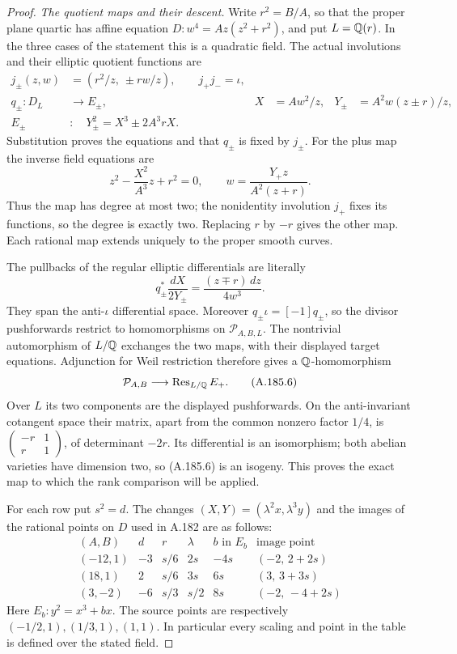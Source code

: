\begin{proof}
\emph{The quotient maps and their descent.}
Write \(r^2=B/A\), so that the proper plane quartic has affine equation
\(D:w^4=Az(z^2+r^2)\), and put \(L=\mathbb Q(r)\).  In the three cases
of the statement this is a quadratic field.  The actual involutions
and their elliptic quotient functions are
\[
\begin{aligned}
 j_\pm(z,w)&=(r^2/z,\ \pm rw/z),\qquad j_+j_-=\iota,\\
 q_\pm:D_L&\longrightarrow E_\pm,
 &X&=Aw^2/z,&Y_\pm&=A^2w(z\pm r)/z,\\
 E_\pm&:\quad Y_\pm^2=X^3\pm2A^3rX.
\end{aligned}
\tag{A.185.3}
\]
Substitution proves the equations and that \(q_\pm\) is fixed by
\(j_\pm\).  For the plus map the inverse field equations are
\[
 z^2-\frac{X^2}{A^3}z+r^2=0,
 \qquad w=\frac{Y_+z}{A^2(z+r)}.
\tag{A.185.4}
\]
Thus the map has degree at most two; the nonidentity involution
\(j_+\) fixes its functions, so the degree is exactly two.
Replacing \(r\) by \(-r\) gives the other map.  Each rational map
extends uniquely to the proper smooth curves.

The pullbacks of the regular elliptic differentials are literally
\[
 q_\pm^*\frac{dX}{2Y_\pm}
       =\frac{(z\mp r)\,dz}{4w^3}.
\tag{A.185.5}
\]
They span the anti-\(\iota\) differential space.  Moreover
\(q_\pm\iota=[-1]q_\pm\), so the divisor pushforwards restrict
to homomorphisms on \(\mathcal P_{A,B,L}\).  The nontrivial
automorphism of \(L/\mathbb Q\) exchanges the two maps, with their
displayed target equations.  Adjunction for Weil restriction
therefore gives a \(\mathbb Q\)-homomorphism
\[
 \mathcal P_{A,B}\longrightarrow
       \operatorname{Res}_{L/\mathbb Q}E_+.
\tag{A.185.6}
\]
Over \(L\) its two components are the displayed pushforwards.
On the anti-invariant cotangent space their matrix, apart from the
common nonzero factor \(1/4\), is
\(\left(\begin{smallmatrix}-r&1\\r&1\end{smallmatrix}\right)\),
of determinant \(-2r\).  Its differential is an isomorphism;
both abelian varieties have dimension two, so (A.185.6) is an
isogeny.  This proves the exact map to which the rank comparison
will be applied.

For each row put \(s^2=d\).  The changes
\((X,Y)=(\lambda^2x,\lambda^3y)\) and the images of the rational
points on \(D\) used in A.182 are as follows:
\[
\begin{array}{c|r|c|c|c|c}
(A,B)&d&r&\lambda&b\text{ in }E_b&\text{image point}\\ \hline
(-12,1)&-3&s/6&2s&-4s&(-2,\,2+2s)\\
(18,1)&2&s/6&3s&6s&(3,\,3+3s)\\
(3,-2)&-6&s/3&s/2&8s&(-2,\,-4+2s)
\end{array}
\tag{A.185.7}
\]
Here \(E_b:y^2=x^3+bx\).  The source points are respectively
\((-1/2,1),(1/3,1),(1,1)\).  In particular every scaling and
point in the table is defined over the stated field.


\end{proof}
